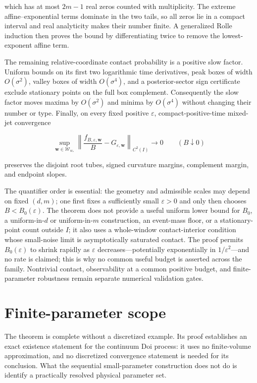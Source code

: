 \documentclass{iopjournal}
\theoremstyle{plain}
\theoremstyle{definition}
\begin{document}
which has at most $2m-1$ real zeros counted with multiplicity.  The extreme
affine--exponential terms dominate in the two tails, so all zeros lie in a
compact interval and real analyticity makes their number finite.  A
generalized Rolle induction then proves the bound by differentiating twice to
remove the lowest-exponent affine term.

The remaining relative-coordinate contact probability is a positive slow
factor.  Uniform bounds on its first two logarithmic time derivatives, peak
boxes of width $O(\sigma^2)$, valley boxes of width $O(\sigma^4)$, and a
posterior-sector sign certificate exclude stationary points on the full box
complement.  Consequently the slow factor moves maxima by $O(\sigma^2)$ and
minima by $O(\sigma^4)$ without changing their number or type.  Finally, on
every fixed positive $\varepsilon$, compact-positive-time mixed-jet
convergence

\begin{equation}
 \sup_{\bm w\in\mathcal W_{w_*}}
 \left\|\frac{f_{B,\varepsilon,\bm w}}{B}
       -G_{\varepsilon,\bm w}\right\|_{C^2(I)}
 \longrightarrow0
 \qquad (B\downarrow0)
 \label{eq:exact-m-weak-budget}
\end{equation}

preserves the disjoint root tubes, signed curvature margins, complement
margin, and endpoint slopes.

The quantifier order is essential: the geometry and admissible scales may
depend on fixed $(d,m)$; one first fixes a sufficiently small
$\varepsilon>0$ and only then chooses $B<B_0(\varepsilon)$.  The theorem does
not provide a useful uniform lower bound for $B_0$, a uniform-in-$d$ or
uniform-in-$m$ construction, an event-mass floor, or a stationary-point count
outside $I$; it also uses a whole-window contact-interior condition whose
small-noise limit is asymptotically saturated contact.  The proof permits
$B_0(\varepsilon)$ to shrink rapidly as $\varepsilon$ decreases---potentially
exponentially in $1/\varepsilon^2$---and no rate is claimed; this is why no
common useful budget is asserted across the family.  Nontrivial contact,
observability at a common positive budget, and finite-parameter robustness
remain separate numerical validation gates.

\section{Finite-parameter scope}
\label{sec:finite-scope}

The theorem is complete without a discretized example.  Its proof establishes
an exact existence statement for the continuum Doi process: it uses no
finite-volume approximation, and no discretized convergence statement is
needed for its conclusion.  What the sequential small-parameter construction
does not do is identify a practically resolved physical parameter set.
\end{document}
